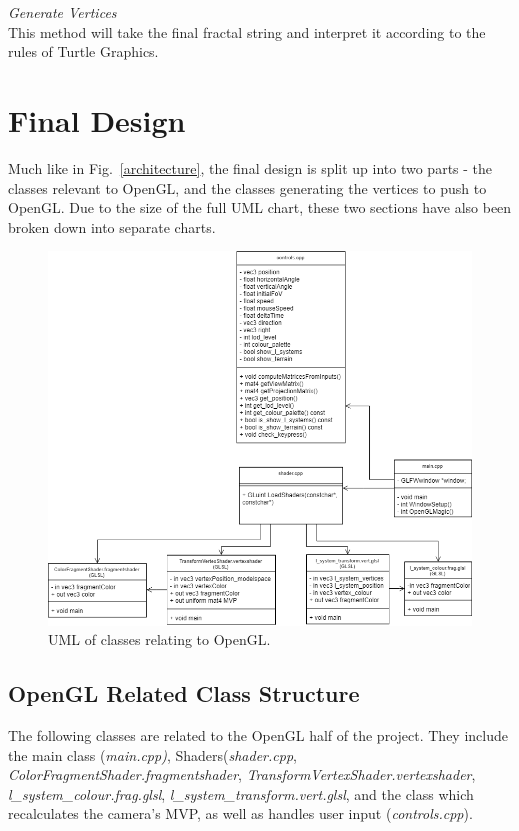 \documentclass[a4paper,10pt]{report}
\begin{document}
\textit{Generate Vertices}\\

This method will take the final fractal string and interpret it according to the rules of Turtle Graphics.

\clearpage

\section{Final Design}

Much like in Fig.~\ref{architecture}, the final design is split up into two parts - the classes relevant to OpenGL, and the classes generating the vertices to push to OpenGL. Due to the size of the full UML chart, these two sections have also been broken down into separate charts.

\begin{figure}[h!]
\centering
  \includegraphics[width=1\textwidth]{Images/Charts/OpenGL_UML.png}
 \caption{UML of classes relating to OpenGL.}
 \label{fig:opengl_uml}
\end{figure}


\subsection{OpenGL Related Class Structure}

The following classes are related to the OpenGL half of the project. They include the main class (\textit{main.cpp)}, Shaders(\textit{shader.cpp}, \textit{ColorFragmentShader.fragmentshader}, \textit{TransformVertexShader.vertexshader}, \textit{l\_system\_colour.frag.glsl}, \textit{l\_system\_transform.vert.glsl}, and the class which recalculates the camera's MVP, as well as handles user input (\textit{controls.cpp}). 
\end{document}
